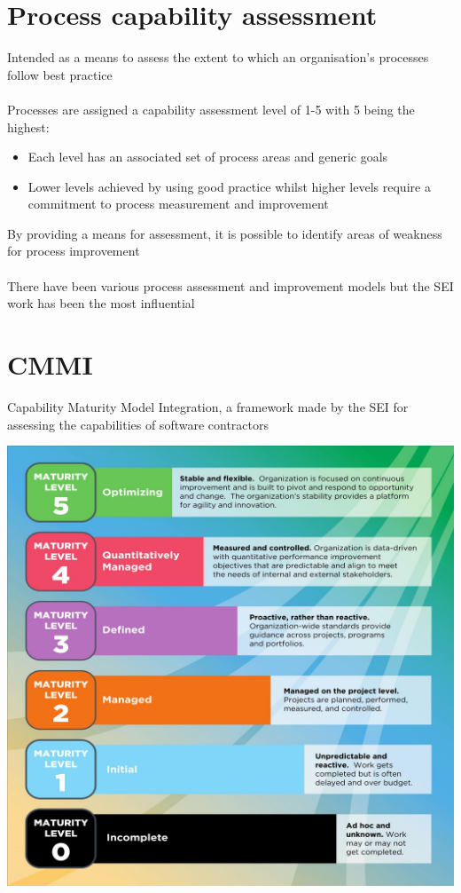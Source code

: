 \documentclass{article}[18pt]
\begin{document}
\section{Process capability assessment}
Intended as a means to assess the extent to which an organisation's processes follow best practice\\
\\
Processes are assigned a capability assessment level of 1-5 with 5 being the highest:
\begin{itemize}
	\item Each level has an associated set of process areas and generic goals
	\item Lower levels achieved by using good practice whilst higher levels require a commitment to process measurement and improvement
\end{itemize}
By providing a means for assessment, it is possible to identify areas of weakness for process improvement\\
\\
There have been various process assessment and improvement models but the SEI work has been the most influential
\section{CMMI}
\begin{definition}[CMMI]
	Capability Maturity Model Integration, a framework made by the SEI for assessing the capabilities of software contractors
\end{definition}
\includegraphics[scale=0.5]{CMMI}
\end{document}
